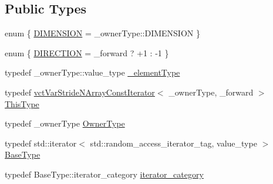 \subsection*{Public Types}
\begin{DoxyCompactItemize}
\item 
enum \{ \hyperlink{classvct_var_stride_n_array_const_iterator_af8a3a7bff8c62645957f37e5f0a2cb26a66232514960f77bde765de7883b9c9ad}{D\+I\+M\+E\+N\+S\+I\+O\+N} = \+\_\+owner\+Type\+:\+:D\+I\+M\+E\+N\+S\+I\+O\+N
 \}
\item 
enum \{ \hyperlink{classvct_var_stride_n_array_const_iterator_af0ff516839367c7e5b697e375001ec43a12bc9e225c77c3bac1de598aa549843b}{D\+I\+R\+E\+C\+T\+I\+O\+N} = \+\_\+forward ? +1 \+: -\/1
 \}
\item 
typedef \+\_\+owner\+Type\+::value\+\_\+type \hyperlink{classvct_var_stride_n_array_const_iterator_adb02654cc147e6ce3ceef03ebe78c4e2}{\+\_\+element\+Type}
\item 
typedef \hyperlink{classvct_var_stride_n_array_const_iterator}{vct\+Var\+Stride\+N\+Array\+Const\+Iterator}$<$ \+\_\+owner\+Type, \+\_\+forward $>$ \hyperlink{classvct_var_stride_n_array_const_iterator_ac729d2af265785aad6fdd43a70fbffdb}{This\+Type}
\item 
typedef \+\_\+owner\+Type \hyperlink{classvct_var_stride_n_array_const_iterator_ac75d53a8defeee467ba9ebe2962e29ac}{Owner\+Type}
\item 
typedef std\+::iterator$<$ std\+::random\+\_\+access\+\_\+iterator\+\_\+tag, value\+\_\+type $>$ \hyperlink{classvct_var_stride_n_array_const_iterator_a7aa82e6a4135b2dca6679c1253c9aa34}{Base\+Type}
\item 
typedef Base\+Type\+::iterator\+\_\+category \hyperlink{classvct_var_stride_n_array_const_iterator_a09142c21a89b54a40ad29eb7972c6f78}{iterator\+\_\+category}
\end{DoxyCompactItemize}
